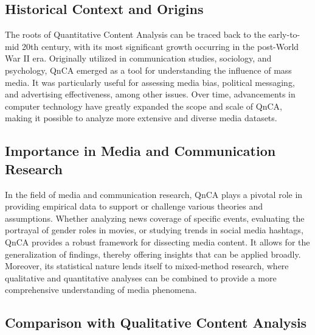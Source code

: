 \documentclass[
  b5paper]{book}
\begin{document}
\hypertarget{historical-context-and-origins}{%
\subsection*{Historical Context and Origins}\label{historical-context-and-origins}}

The roots of Quantitative Content Analysis can be traced back to the early-to-mid 20th century, with its most significant growth occurring in the post-World War II era. Originally utilized in communication studies, sociology, and psychology, QnCA emerged as a tool for understanding the influence of mass media. It was particularly useful for assessing media bias, political messaging, and advertising effectiveness, among other issues. Over time, advancements in computer technology have greatly expanded the scope and scale of QnCA, making it possible to analyze more extensive and diverse media datasets.

\hypertarget{importance-in-media-and-communication-research}{%
\subsection*{Importance in Media and Communication Research}\label{importance-in-media-and-communication-research}}

In the field of media and communication research, QnCA plays a pivotal role in providing empirical data to support or challenge various theories and assumptions. Whether analyzing news coverage of specific events, evaluating the portrayal of gender roles in movies, or studying trends in social media hashtags, QnCA provides a robust framework for dissecting media content. It allows for the generalization of findings, thereby offering insights that can be applied broadly. Moreover, its statistical nature lends itself to mixed-method research, where qualitative and quantitative analyses can be combined to provide a more comprehensive understanding of media phenomena.

\hypertarget{comparison-with-qualitative-content-analysis}{%
\subsection*{Comparison with Qualitative Content Analysis}\label{comparison-with-qualitative-content-analysis}}
\end{document}
